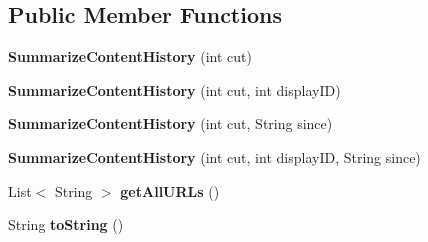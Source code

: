 \subsection*{Public Member Functions}
\begin{DoxyCompactItemize}
\item 
\hypertarget{classgov_1_1fnal_1_1ppd_1_1dd_1_1util_1_1specific_1_1SummarizeContentHistory_a545f156232456ac6d7706d3e2d8a5671}{{\bfseries Summarize\-Content\-History} (int cut)}\label{classgov_1_1fnal_1_1ppd_1_1dd_1_1util_1_1specific_1_1SummarizeContentHistory_a545f156232456ac6d7706d3e2d8a5671}

\item 
\hypertarget{classgov_1_1fnal_1_1ppd_1_1dd_1_1util_1_1specific_1_1SummarizeContentHistory_a96a637407dacad1fcaf991df32c68d05}{{\bfseries Summarize\-Content\-History} (int cut, int display\-I\-D)}\label{classgov_1_1fnal_1_1ppd_1_1dd_1_1util_1_1specific_1_1SummarizeContentHistory_a96a637407dacad1fcaf991df32c68d05}

\item 
\hypertarget{classgov_1_1fnal_1_1ppd_1_1dd_1_1util_1_1specific_1_1SummarizeContentHistory_a567b7c290c2919a56c023644defafe34}{{\bfseries Summarize\-Content\-History} (int cut, String since)}\label{classgov_1_1fnal_1_1ppd_1_1dd_1_1util_1_1specific_1_1SummarizeContentHistory_a567b7c290c2919a56c023644defafe34}

\item 
\hypertarget{classgov_1_1fnal_1_1ppd_1_1dd_1_1util_1_1specific_1_1SummarizeContentHistory_aecebd07f7308c2b9651b730e81a6c91f}{{\bfseries Summarize\-Content\-History} (int cut, int display\-I\-D, String since)}\label{classgov_1_1fnal_1_1ppd_1_1dd_1_1util_1_1specific_1_1SummarizeContentHistory_aecebd07f7308c2b9651b730e81a6c91f}

\item 
\hypertarget{classgov_1_1fnal_1_1ppd_1_1dd_1_1util_1_1specific_1_1SummarizeContentHistory_a9c72f09ca5c395ea06aa3b3b447e6b81}{List$<$ String $>$ {\bfseries get\-All\-U\-R\-Ls} ()}\label{classgov_1_1fnal_1_1ppd_1_1dd_1_1util_1_1specific_1_1SummarizeContentHistory_a9c72f09ca5c395ea06aa3b3b447e6b81}

\item 
\hypertarget{classgov_1_1fnal_1_1ppd_1_1dd_1_1util_1_1specific_1_1SummarizeContentHistory_a823a11ae396d447a2e3b22b108fdd395}{String {\bfseries to\-String} ()}\label{classgov_1_1fnal_1_1ppd_1_1dd_1_1util_1_1specific_1_1SummarizeContentHistory_a823a11ae396d447a2e3b22b108fdd395}

\end{DoxyCompactItemize}
